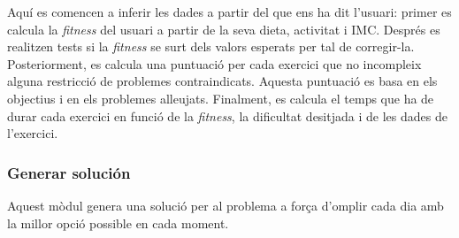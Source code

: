 \documentclass[a4paper, 12pt, UTF8]{article}
\begin{document}
Aquí es comencen a inferir les dades a partir del que ens ha dit l'usuari: primer es calcula la \textit{fitness} del usuari a partir de la seva dieta, activitat i IMC. Després es realitzen tests si la \textit{fitness} se surt dels valors esperats per tal de corregir-la.
Posteriorment, es calcula una puntuació per cada exercici que no incompleix alguna restricció de problemes contraindicats. Aquesta puntuació es basa en els objectius i en els problemes alleujats. Finalment, es calcula el temps que ha de durar cada exercici en funció de la \textit{fitness}, la dificultat desitjada i de les dades de l'exercici.

\subsubsection{Generar solución}
Aquest mòdul genera una solució per al problema a força d'omplir cada dia amb la millor opció possible en cada moment.
\end{document}
